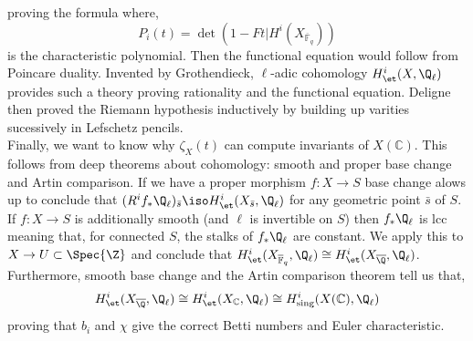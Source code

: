 \documentclass[11pt]{article}
\renewcommand{\F}{\mathbb{F}}
\newcommand{\Fbar}{\overline{\F}}
\begin{document}
proving the formula where,
\[ P_i(t) = \det{(1 - F t | H^i(X_{\Fbar_q}))} \]
is the characteristic polynomial. Then the functional equation would follow from Poincare duality. Invented by Grothendieck, $\ell$-adic \etale cohomology $H^i_{\et}(X, \Q_\ell)$ provides such a theory proving rationality and the functional equation. Deligne then proved the Riemann hypothesis inductively by building up varities sucessively in Lefschetz pencils. 
\bigskip\\
Finally, we want to know why $\zeta_X(t)$ can compute invariants of $X(\mathbb{C})$. This follows from deep theorems about \etale cohomology: smooth and proper base change and Artin comparison. If we have a proper morphism $f : X \to S$ base change alows up to conclude that $(R^i f_* \Q_\ell)_{\bar{s}} \iso H^i_{\et}(X_{\bar{s}}, \Q_{\ell})$ for any geometric point $\bar{s}$ of $S$. If $f : X \to S$ is additionally smooth (and $\ell$ is invertible on $S$) then $f_* \Q_{\ell}$ is lcc meaning that, for connected $S$, the stalks of $f_* \Q_{\ell}$ are constant. We apply this to $X \to U \subset \Spec{\Z}$ and conclude that $H^i_{\et}(X_{\Fbar_q}, \Q_\ell) \cong H^i_{\et}(X_{\overline{\Q}}, \Q_{\ell})$. Furthermore, smooth base change and the Artin comparison theorem tell us that,
\[ H^i_{\et}(X_{\overline{\Q}}, \Q_{\ell}) \cong  H^i_{\et}(X_{\mathbb{C}}, \Q_{\ell}) \cong H_{\text{sing}}^i(X(\mathbb{C}), \Q_\ell) \]
proving that $b_i$ and $\chi$ give the correct Betti numbers and Euler characteristic.
\end{document}
